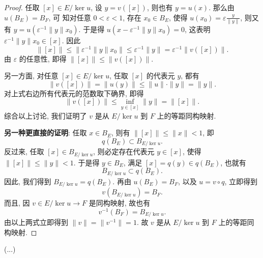 \begin{proof}
    任取 $[x]\in E/\ker u$, 设 $y=v([x])$, 则也有 $y=u(x)$. 那么由 $u(B_{E})=B_{F}$, 可
    知对任意 $0<\varepsilon<1$, 存在 $x_{0}\in B_{E}$, 使得 
    $u(x_0)=\varepsilon \frac{y}{\|y\|}$, 则又有 $y=u(\varepsilon^{-1}\|y\| x_{0})$.
    于是得 $u(x-\varepsilon^{-1}\|y\| x_{0})=0$, 这表明 $\varepsilon^{-1}\|y\| x_{0}\in [x]$. 因此
    \[
    \|[x]\| \leq\bigl\|\varepsilon^{-1}\|y\|x_{0}\bigr\|\leq\varepsilon^{-1}\|y\|=\varepsilon^{-1}\|v([x])\| .
    \]
    由 $\varepsilon$ 的任意性, 即得 $\|[x]\|\leq\|v([x])\|$.

    另一方面, 对任意 $[x]\in E/\ker u$, 任取 $[x]$ 的代表元 $y$, 都有
    \[
    \|v([x])\|=\|u(y)\| \leq\|u\|\cdot\|y\|=\|y\|.
    \]
    对上式右边所有代表元的范数取下确界, 即得
    \[\|v([x])\|\leq\inf_{y\in [x]}\|y\|=\|[x]\|.\]
    综合以上讨论, 我们证明了 $v$ 是从 $E/\ker u$ 到 $F$ 上的等距同构映射.

    \textbf{另一种更直接的证明}:
    任取 $x\in B_E$, 则有 $\|[x]\|\leq\|x\|<1$, 即
    \[q(B_E)\subset B_{E/\ker u}.\]
    反过来, 任取 $[x]\in B_{E/\ker u}$, 则必定存在代表元 $y\in[x]$, 
    使得 $\|[x]\|\leq\|y\|<1$. 于是得 $y\in B_{E}$, 满足 $[x]=q(y)\in q(B_{E})$, 也就有
    \[
    B_{E/\ker u}\subset q(B_{E}).
    \]
    因此, 我们得到 $B_{E/\ker u}=q(B_{E})$. 再由 $u(B_{E})=B_{F}$, 以及 $u=v \circ q$, 立即得到
    \[
    v(B_{E/\ker u})=B_{F}.
    \]
    而且, 因 $v\in E/\ker u\to F$ 是同构映射, 故也有
    \[
    v^{-1}(B_{F})=B_{E/\ker u}.
    \]
    由以上两式立即得到 $\|v\|=\|v^{-1}\|=1$. 故 $v$ 是从 $E/\ker u$ 到 $F$ 上的等距同构映射.
\end{proof}


\begin{exercise}
  (...)
\end{exercise}


